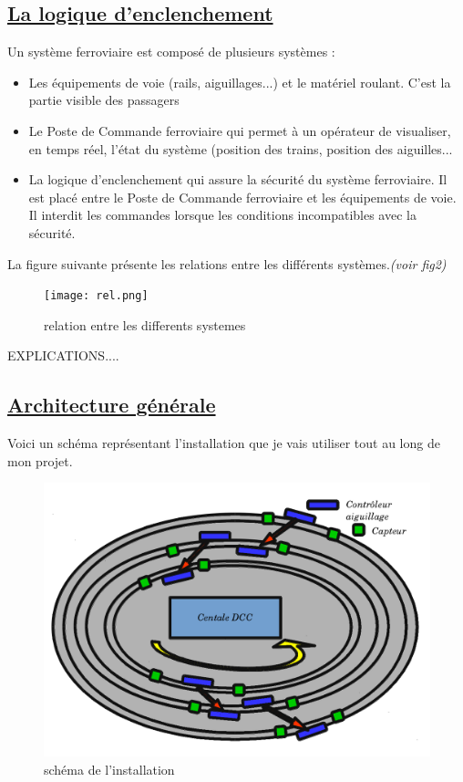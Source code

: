 \subsection{\underline{ La logique d'enclenchement}}
\label{sec:log_ixl}

Un système ferroviaire est compos\'e de plusieurs systèmes :
\begin{itemize}
  \item Les \'equipements de voie (rails, aiguillages...) et le mat\'eriel
    roulant. C'est la partie visible des passagers
  \item Le Poste de Commande ferroviaire qui permet à un op\'erateur de
    visualiser, en temps r\'eel, l'\'etat du système (position des trains,
    position des aiguilles...
  \item La logique d'enclenchement qui assure la s\'ecurit\'e du système
    ferroviaire. Il est plac\'e entre le Poste de Commande ferroviaire
    et les \'equipements de voie. Il interdit les commandes lorsque les
    conditions incompatibles avec la s\'ecurit\'e. 
\end{itemize}

\newpage

La figure suivante pr\'esente les relations entre les diff\'erents
systèmes.\emph{(voir fig2)}

\begin{figure}[ht]
\centering
\texttt{[image: rel.png]}
\caption{relation entre les differents systemes}
\label{fig2}
\end{figure}


EXPLICATIONS....

\subsection{\underline{ Architecture g\'en\'erale}}
\label{sec:archi}

  Voici un sch\'ema repr\'esentant l'installation que je vais
utiliser tout au long de mon projet.


\begin{figure}[ht]
\centering
\includegraphics[scale=0.30]{schema.png}
\caption{sch\'ema de l'installation}
\label{fig3}
\end{figure}

